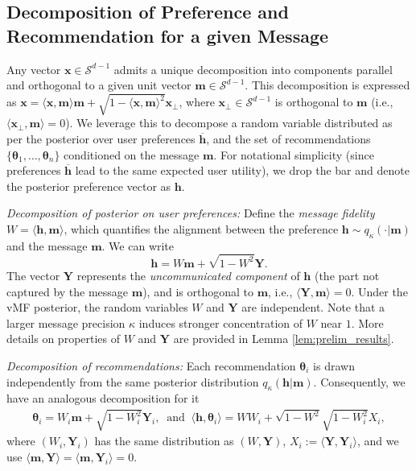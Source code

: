 \documentclass[12pt]{article}
\theoremstyle{definition}
\theoremstyle{remark}
\begin{document}
\subsection{Decomposition of Preference and Recommendation for a given Message}
\label{sec:decomposition}
Any vector $\mathbf{x} \in \mathcal{S}^{d-1}$ admits a unique decomposition into components parallel and orthogonal to a given unit vector $\mathbf{m} \in \mathcal{S}^{d-1}$. This decomposition is expressed as $\mathbf{x} = \langle \mathbf{x} , \mathbf{m} \rangle \mathbf{m} + \sqrt{1-\langle \mathbf{x} , \mathbf{m} \rangle^2} \mathbf{x}_{\perp}$, where $\mathbf{x}_{\perp} \in \mathcal{S}^{d-1}$ is orthogonal to $\mathbf{m}$ (i.e., $\langle \mathbf{x}_{\perp} , \mathbf{m} \rangle = 0$).  We leverage this to decompose a random variable distributed as per the posterior over user preferences $\overline{\mathbf{h}}$, and the set of recommendations $\{ \boldsymbol\theta_1, \dots, \boldsymbol\theta_n\}$ conditioned on the message $\mathbf{m}$. For notational simplicity (since preferences $\overline{\mathbf{h}}$ lead to the same expected user utility), we drop the bar and denote the posterior preference vector as $\mathbf{h}$.

\textit{Decomposition of posterior on user preferences:} Define the \textit{message fidelity} $W = \langle \mathbf{h}, \mathbf{m} \rangle$, which quantifies the alignment between the preference $\mathbf{h}\sim q_{\kappa}(\cdot|\mathbf{m})$ and the message $\mathbf{m}$. We can write
\begin{equation}
\label{eq:h_decomposition}
    \mathbf{h} = W \mathbf{m} + \sqrt{1-W^2} \mathbf{Y}.
\end{equation}
The vector $\mathbf{Y}$ represents the \textit{uncommunicated component} of $\mathbf{h}$ (the part not captured by the message $\mathbf{m}$), and is orthogonal to $\mathbf{m}$, i.e., $\langle \mathbf{Y} , \mathbf{m} \rangle = 0$. Under the vMF posterior, the random variables $W$ and $\mathbf{Y}$ are independent. Note that a larger message precision $\kappa$ induces stronger concentration of $W$ near $1$. More details on properties of $W$ and $\mathbf{Y}$ are provided in Lemma \ref{lem:prelim_results}.

\textit{Decomposition of recommendations:} Each recommendation $\boldsymbol{\theta}_i$ is drawn independently from the same posterior distribution $q_{\kappa}(\mathbf{h}|\mathbf{m})$. Consequently, we have an analogous decomposition for it
\begin{align}
\label{eq:util_representation}
    \boldsymbol\theta_i = W_i \mathbf{m} + \sqrt{1-W_i^2} \mathbf{Y}_i, \ \text{ and } \ \langle \mathbf{h} , \boldsymbol{\theta}_i \rangle = W W_i + \sqrt{1-W^2} \sqrt{1-W_i^2} X_i,
\end{align}
where $(W_i,\mathbf{Y}_i)$ has the same distribution as $(W,\mathbf{Y})$,  $X_i := \langle \mathbf{Y} , \mathbf{Y}_i \rangle$, and we use $\langle \mathbf{m} , \mathbf{Y} \rangle = \langle \mathbf{m} , \mathbf{Y}_i \rangle = 0$.
\end{document}

